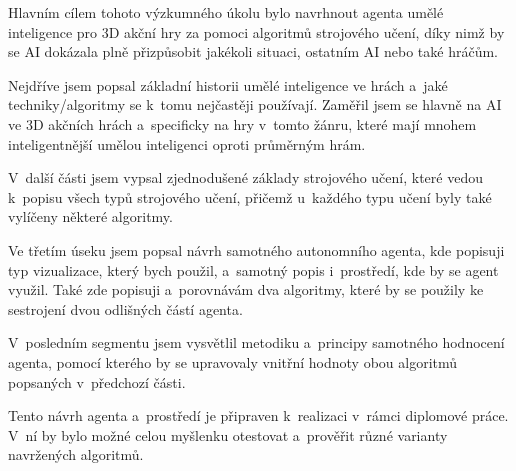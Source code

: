 Hlavním cílem tohoto výzkumného úkolu bylo navrhnout agenta umělé inteligence pro 3D akční hry za pomoci algoritmů strojového učení, díky nimž by se AI dokázala plně přizpůsobit jakékoli situaci, ostatním AI nebo také hráčům.

Nejdříve jsem popsal základní historii umělé inteligence ve hrách a~jaké techniky/algoritmy se k~tomu nejčastěji používají. Zaměřil jsem se hlavně na AI ve 3D akčních hrách a~specificky na hry v~tomto žánru, které mají mnohem inteligentnější umělou inteligenci oproti průměrným hrám.

V~další části jsem vypsal zjednodušené základy strojového učení, které vedou k~popisu všech typů strojového učení, přičemž u~každého typu učení byly také vylíčeny některé algoritmy.

Ve třetím úseku jsem popsal návrh samotného autonomního agenta, kde popisuji typ vizualizace, který bych použil, a~samotný popis i~prostředí, kde by se agent využil. Také zde popisuji a~porovnávám dva algoritmy, které by se použily ke sestrojení dvou odlišných částí agenta.

V~posledním segmentu jsem vysvětlil metodiku a~principy samotného hodnocení agenta, pomocí kterého by se upravovaly vnitřní hodnoty obou algoritmů popsaných v~předchozí části.

Tento návrh agenta a~prostředí je připraven k~realizaci v~rámci diplomové práce. V~ní by bylo možné celou myšlenku otestovat a~prověřit různé varianty navržených algoritmů.
